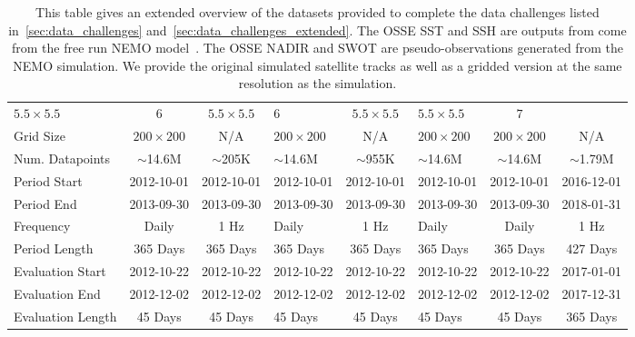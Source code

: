 \begin{landscape}
\begin{table}[ht]
{\begin{tabular}{lcclclcc}
$5.5\times 5.5$ &
$6$ &
$5.5\times 5.5$ &
$6$ &
$5.5\times 5.5$ &
$5.5\times 5.5$ &
$7$ \\
Grid Size &
$200\times 200$ & 
N/A &
$200\times 200$ & 
N/A &
$200\times 200$ & 
$200\times 200$ & 
N/A \\
Num. Datapoints &
$\sim$14.6M & 
$\sim$205K & 
$\sim$14.6M & 
$\sim$955K & 
$\sim$14.6M & 
$\sim$14.6M & 
$\sim$1.79M \\ \midrule
Period Start & 
2012-10-01 & 2012-10-01 & 2012-10-01 & 2012-10-01 & 
2012-10-01 & 2012-10-01 & 2016-12-01 \\
Period End & 
2013-09-30 & 2013-09-30 & 2013-09-30 & 2013-09-30 & 
2013-09-30 & 2013-09-30 & 2018-01-31 \\
Frequency  & 
Daily & 1 Hz  & Daily & 1 Hz  & Daily & Daily & 1 Hz \\ 
Period Length & 365 Days & 365 Days & 365 Days &
365 Days & 365 Days & 365 Days & 427 Days \\
\midrule
Evaluation Start & 
2012-10-22 & 2012-10-22 & 2012-10-22 & 2012-10-22 & 
2012-10-22 & 2012-10-22 & 2017-01-01 \\
Evaluation End & 
2012-12-02 & 2012-12-02 & 2012-12-02 & 2012-12-02 & 
2012-12-02 & 2012-12-02 & 2017-12-31 \\ 
Evaluation Length & 45 Days & 45 Days & 45 Days &
45 Days & 45 Days & 45 Days & 365 Days \\
\bottomrule
\end{tabular}}
\caption{This table gives an extended overview of the datasets provided to complete the data challenges listed in~\ref{sec:data_challenges} and~\ref{sec:data_challenges_extended}. The OSSE SST and SSH are outputs from come from the free run NEMO model~\citep{NEMOAJAYI2020}. The OSSE NADIR and SWOT are pseudo-observations generated from the NEMO simulation. We provide the original simulated satellite tracks as well as a gridded version at the same resolution as the simulation. 
}
\label{c5tb:datasetsmega}
\end{table}
\end{landscape}


